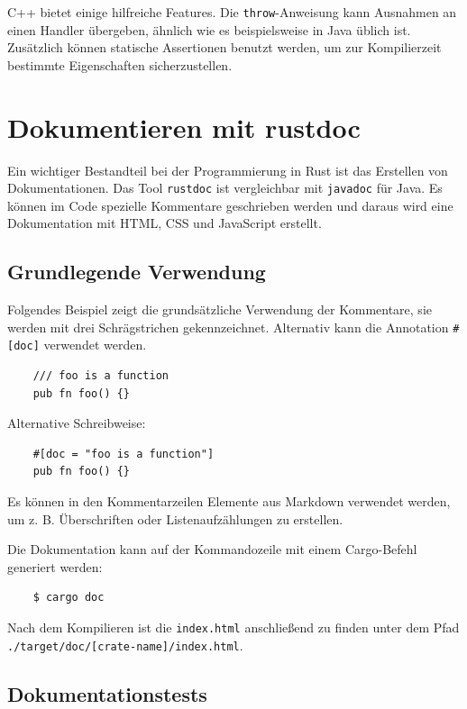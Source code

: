 C++ bietet einige hilfreiche Features. Die \verb"throw"-Anweisung kann Ausnahmen an einen Handler übergeben, ähnlich wie es beispielsweise in Java üblich ist. Zusätzlich können statische Assertionen benutzt werden, um zur Kompilierzeit bestimmte Eigenschaften sicherzustellen.


\section{Dokumentieren mit rustdoc}

Ein wichtiger Bestandteil bei der Programmierung in Rust ist das Erstellen von Dokumentationen. Das Tool \verb"rustdoc" ist vergleichbar mit \verb"javadoc" für Java. Es können im Code spezielle Kommentare geschrieben werden und daraus wird eine Dokumentation mit HTML, CSS und JavaScript erstellt.

\subsection{Grundlegende Verwendung}

Folgendes Beispiel zeigt die grundsätzliche Verwendung der Kommentare, sie werden mit drei Schrägstrichen gekennzeichnet. Alternativ kann die Annotation \verb"#[doc]" verwendet werden.

\begin{lstlisting}
    /// foo is a function
    pub fn foo() {}
\end{lstlisting}

Alternative Schreibweise:

\begin{lstlisting}
    #[doc = "foo is a function"]
    pub fn foo() {}
\end{lstlisting}

Es können in den Kommentarzeilen Elemente aus Markdown verwendet werden, um z. B. Überschriften oder Listenaufzählungen zu erstellen.

Die Dokumentation kann auf der Kommandozeile mit einem Cargo-Befehl ge\-ne\-riert werden:

\begin{lstlisting}
    $ cargo doc
\end{lstlisting}

Nach dem Kompilieren ist die \verb"index.html" anschließend zu finden unter dem Pfad \texttt{./target/doc/[crate-name]/index.html}.

\subsection{Dokumentationstests}

